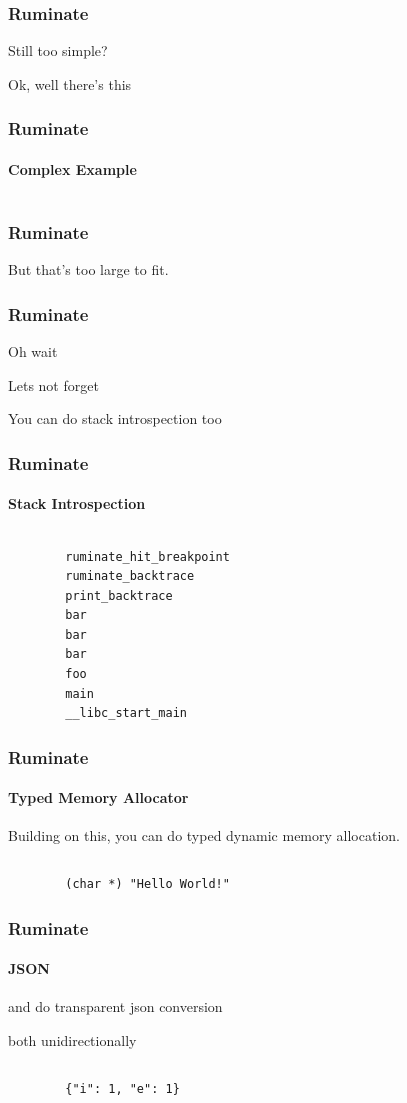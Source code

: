 \documentclass{beamer}
\begin{document}
\begin{frame}
	\frametitle{Ruminate}

	Still too simple?

	\pause

	Ok, well there's this
\end{frame}

\begin{frame}
	\frametitle{Ruminate}
	\framesubtitle{Complex Example}

	\inputminted[tabsize=4,linenos=false]{c}{long_struct_introspect.c}
\end{frame}

\begin{frame}
	\frametitle{Ruminate}

	But that's too large to fit.
\end{frame}

\begin{frame}
	\frametitle{Ruminate}

	Oh wait

	\pause

	Lets not forget

	\pause

	You can do stack introspection too
\end{frame}

\begin{frame}
	\frametitle{Ruminate}
	\framesubtitle{Stack Introspection}

	\inputminted[tabsize=4,linenos]{c}{ruminate_stack.c}
	\pause
	\begin{verbatim}
		ruminate_hit_breakpoint
		ruminate_backtrace
		print_backtrace
		bar
		bar
		bar
		foo
		main
		__libc_start_main
	\end{verbatim}
\end{frame}

\begin{frame}
	\frametitle{Ruminate}
	\framesubtitle{Typed Memory Allocator}

	Building on this, you can do typed dynamic memory allocation.

	\pause

	\inputminted[tabsize=4,linenos]{c}{ruminate_memory.c}

	\begin{Verbatim}
		(char *) "Hello World!"
	\end{Verbatim}
\end{frame}

\begin{frame}
	\frametitle{Ruminate}
	\framesubtitle{JSON}

	and do transparent json conversion

	\pause

	both unidirectionally

	\inputminted[tabsize=4,linenos]{c}{ruminate_jansson_uni.c}

	\begin{Verbatim}
		{"i": 1, "e": 1}
	\end{Verbatim}
\end{frame}
\end{document}
